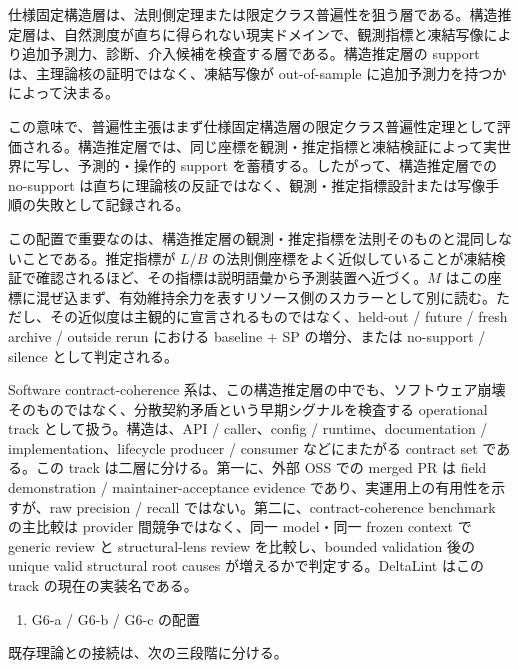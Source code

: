 \documentclass[12pt,a4paper]{article}
\begin{document}
仕様固定構造層は、法則側定理または限定クラス普遍性を狙う層である。構造推定層は、自然測度が直ちに得られない現実ドメインで、観測指標と凍結写像により追加予測力、診断、介入候補を検査する層である。構造推定層の support は、主理論核の証明ではなく、凍結写像が out-of-sample に追加予測力を持つかによって決まる。

この意味で、普遍性主張はまず仕様固定構造層の限定クラス普遍性定理として評価される。構造推定層では、同じ座標を観測・推定指標と凍結検証によって実世界に写し、予測的・操作的 support を蓄積する。したがって、構造推定層での no-support は直ちに理論核の反証ではなく、観測・推定指標設計または写像手順の失敗として記録される。

この配置で重要なのは、構造推定層の観測・推定指標を法則そのものと混同しないことである。推定指標が \(L/B\) の法則側座標をよく近似していることが凍結検証で確認されるほど、その指標は説明語彙から予測装置へ近づく。\(M\) はこの座標に混ぜ込まず、有効維持余力を表すリソース側のスカラーとして別に読む。ただし、その近似度は主観的に宣言されるものではなく、held-out / future / fresh archive / outside rerun における baseline + SP の増分、または no-support / silence として判定される。

Software contract-coherence 系は、この構造推定層の中でも、ソフトウェア崩壊そのものではなく、分散契約矛盾という早期シグナルを検査する operational track として扱う。構造は、API / caller、config / runtime、documentation / implementation、lifecycle producer / consumer などにまたがる contract set である。この track は二層に分ける。第一に、外部 OSS での merged PR は field demonstration / maintainer-acceptance evidence であり、実運用上の有用性を示すが、raw precision / recall ではない。第二に、contract-coherence benchmark の主比較は provider 間競争ではなく、同一 model・同一 frozen context で generic review と structural-lens review を比較し、bounded validation 後の unique valid structural root causes が増えるかで判定する。DeltaLint はこの track の現在の実装名である。

\begin{enumerate}
\def\labelenumi{\arabic{enumi}.}
\setcounter{enumi}{6}
\tightlist
\item
  G6-a / G6-b / G6-c の配置
\end{enumerate}

既存理論との接続は、次の三段階に分ける。
\end{document}
